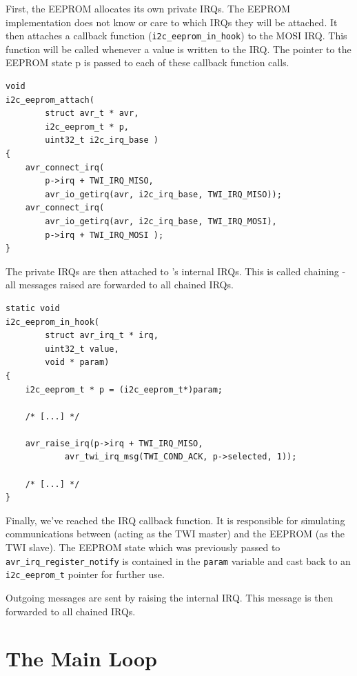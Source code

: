 First, the \ac{EEPROM} allocates its own private \acp{IRQ}. The \ac{EEPROM} implementation
does not know or care to which \simavr \acp{IRQ} they will be attached. It then
attaches a callback function (\lstinline|i2c_eeprom_in_hook|) to the \ac{MOSI} \ac{IRQ}. This
function will be called whenever a value is written to the \ac{IRQ}. The pointer to
the \ac{EEPROM} state p is passed to each of these callback function calls.

\begin{lstlisting}
void
i2c_eeprom_attach(
		struct avr_t * avr,
		i2c_eeprom_t * p,
		uint32_t i2c_irq_base )
{
	avr_connect_irq(
		p->irq + TWI_IRQ_MISO,
		avr_io_getirq(avr, i2c_irq_base, TWI_IRQ_MISO));
	avr_connect_irq(
		avr_io_getirq(avr, i2c_irq_base, TWI_IRQ_MOSI),
		p->irq + TWI_IRQ_MOSI );
}
\end{lstlisting}

The private \acp{IRQ} are then attached to \simavr's internal \acp{IRQ}. This is called
chaining - all messages raised are forwarded to all chained \acp{IRQ}.

\begin{lstlisting}
static void
i2c_eeprom_in_hook(
		struct avr_irq_t * irq,
		uint32_t value,
		void * param)
{
	i2c_eeprom_t * p = (i2c_eeprom_t*)param;

    /* [...] */

    avr_raise_irq(p->irq + TWI_IRQ_MISO,
            avr_twi_irq_msg(TWI_COND_ACK, p->selected, 1));

    /* [...] */
}
\end{lstlisting}

Finally, we've reached the \ac{IRQ} callback function. It is responsible for
simulating communications between \simavr (acting as the \ac{TWI} master) and the
\ac{EEPROM} (as the \ac{TWI} slave). The \ac{EEPROM} state which was previously passed to
\lstinline|avr_irq_register_notify| is contained in the \lstinline|param| variable and cast back to
an \lstinline|i2c_eeprom_t| pointer for further use.

Outgoing messages are sent by raising the internal \ac{IRQ}. This message is then
forwarded to all chained \acp{IRQ}.


\section{The Main Loop} \label{section:mainloop}

